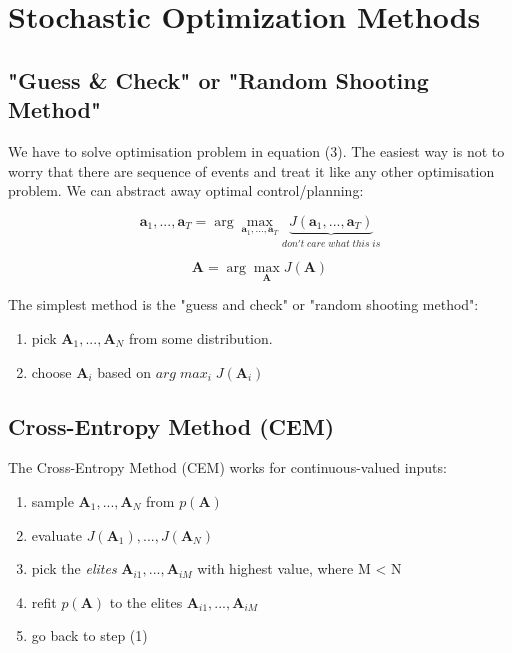 \documentclass{article}
\begin{document}
\section{Stochastic Optimization Methods}
\subsection{"Guess & Check" or "Random Shooting Method"}
We have to solve optimisation problem in equation (3). The easiest way is not to worry that there are sequence of events and treat it like any other optimisation problem. We can abstract away optimal control/planning:

\begin{equation}
    \textbf{a}_1,...,\textbf{a}_\textit{T} 
    = \arg\max_{\textbf{a}_1,...,\textbf{a}_\textit{T}}
    \underbrace{\textit{J}(\textbf{a}_1,...,\textbf{a}_\textit{T})}_{don't\; care\; what\; this\; is}
\end{equation}

\begin{equation}
    \textbf{A} = \arg\max_{\textbf{A}} \textit{J}(\textbf{A})
\end{equation}

The simplest method is the "guess and check" or "random shooting method":

\begin{enumerate}
    \item pick $\textbf{A}_1,...,\textbf{A}_\textit{N} $ from some distribution.
    \item choose $\textbf{A}_{i}$ based on $arg \; max_i \; \textit{J}(\textbf{A}_{i})$
\end{enumerate}

\subsection{Cross-Entropy Method (CEM)}
The Cross-Entropy Method (CEM) works for continuous-valued inputs:

\begin{enumerate}
    \item sample $\textbf{A}_1,...,\textbf{A}_\textit{N} $ from $\textit{p}(\textbf{A})$
    \item evaluate $\textit{J}(\textbf{A}_1),...,\textit{J}(\textbf{A}_N) $
    \item pick the \textit{elites} $\textbf{A}_{i1},...,\textbf{A}_\textit{iM} $ with highest value, where M < N
    \item refit $\textit{p}(\textbf{A})$ to the elites $\textbf{A}_{i1},...,\textbf{A}_\textit{iM} $
    \item go back to step (1)
\end{enumerate}
\end{document}
